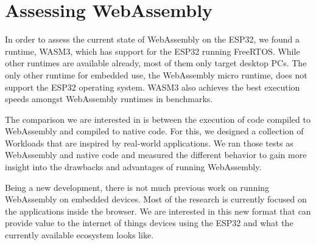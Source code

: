 \section*{Assessing WebAssembly}

In order to assess the current state of WebAssembly on the ESP32, we found a runtime, WASM3, which has support for the ESP32 running FreeRTOS. While other runtimes are available already, most of them only target desktop PCs. The only other runtime for embedded use, the WebAssembly micro runtime, does not support the ESP32 operating system. WASM3 also achieves the best execution speeds amongst WebAssembly runtimes in benchmarks.

The comparison we are interested in is between the execution of code compiled to WebAssembly and compiled to native code. For this, we designed a collection of Workloads that are inspired by real-world applications. We ran those tests as WebAssembly and native code and measured the different behavior to gain more insight into the drawbacks and advantages of running WebAssembly.


Being a new development, there is not much previous work on running WebAssembly on embedded devices. Most of the research is currently focused on the applications inside the browser. We are interested in this new format that can provide value to the internet of things devices using the ESP32 and what the currently available ecosystem looks like.